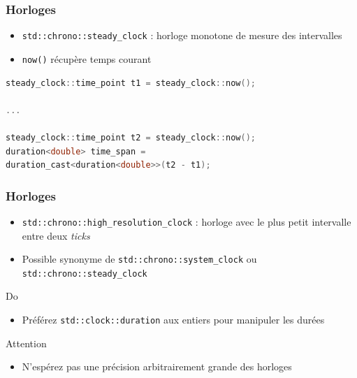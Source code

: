 \documentclass[C++.tex]{subfiles}
\begin{document}
\begin{frame}[fragile]
	\frametitle{Horloges}
	\begin{itemize}
		\item \lstinline|std::chrono::steady_clock| : horloge monotone de mesure des intervalles


		\item \lstinline|now()| récupère temps courant
	\end{itemize}

	\begin{lstlisting}[language=C++]
steady_clock::time_point t1 = steady_clock::now();

...

steady_clock::time_point t2 = steady_clock::now();
duration<double> time_span = 
duration_cast<duration<double>>(t2 - t1);\end{lstlisting}
\end{frame}

\begin{frame}[fragile]
	\frametitle{Horloges}
	\begin{itemize}
		\item \lstinline|std::chrono::high_resolution_clock| : horloge avec le plus petit intervalle entre deux \textit{ticks}
		\item Possible synonyme de \lstinline|std::chrono::system_clock| ou \lstinline|std::chrono::steady_clock|
	\end{itemize}

	\begin{exampleblock}{Do}
		\begin{itemize}
			\item Préférez \lstinline|std::clock::duration| aux entiers pour manipuler les durées
		\end{itemize}

	\end{exampleblock}

	\begin{alertblock}{Attention}
		\begin{itemize}
			\item N'espérez pas une précision arbitrairement grande des horloges
		\end{itemize}

	\end{alertblock}
\end{frame}
\end{document}
